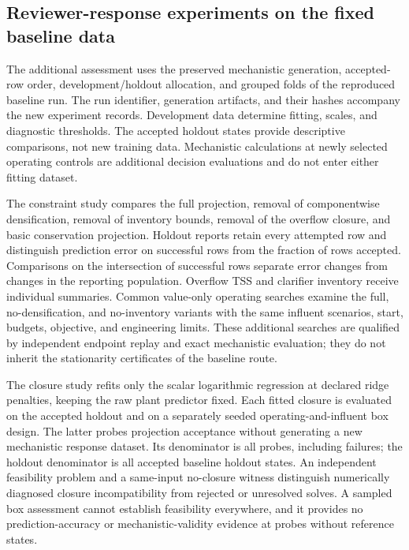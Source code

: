 \documentclass[a4paper,fleqn]{cas-sc}
\begin{document}
\subsection{Reviewer-response experiments on the fixed baseline data}
\label{sec:reviewprotocol}

The additional assessment uses the preserved mechanistic generation, accepted-row order, development/holdout allocation, and grouped folds of the reproduced baseline run. The run identifier, generation artifacts, and their hashes accompany the new experiment records. Development data determine fitting, scales, and diagnostic thresholds. The accepted holdout states provide descriptive comparisons, not new training data. Mechanistic calculations at newly selected operating controls are additional decision evaluations and do not enter either fitting dataset.

The constraint study compares the full projection, removal of componentwise densification, removal of inventory bounds, removal of the overflow closure, and basic conservation projection. Holdout reports retain every attempted row and distinguish prediction error on successful rows from the fraction of rows accepted. Comparisons on the intersection of successful rows separate error changes from changes in the reporting population. Overflow TSS and clarifier inventory receive individual summaries. Common value-only operating searches examine the full, no-densification, and no-inventory variants with the same influent scenarios, start, budgets, objective, and engineering limits. These additional searches are qualified by independent endpoint replay and exact mechanistic evaluation; they do not inherit the stationarity certificates of the baseline route.

The closure study refits only the scalar logarithmic regression at declared ridge penalties, keeping the raw plant predictor fixed. Each fitted closure is evaluated on the accepted holdout and on a separately seeded operating-and-influent box design. The latter probes projection acceptance without generating a new mechanistic response dataset. Its denominator is all probes, including failures; the holdout denominator is all accepted baseline holdout states. An independent feasibility problem and a same-input no-closure witness distinguish numerically diagnosed closure incompatibility from rejected or unresolved solves. A sampled box assessment cannot establish feasibility everywhere, and it provides no prediction-accuracy or mechanistic-validity evidence at probes without reference states.
\end{document}
